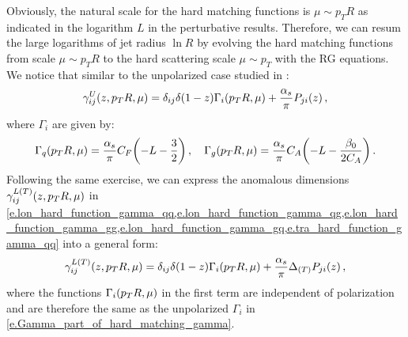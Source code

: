 \documentclass[a4paper, 11 pt]{article}
\begin{document}
Obviously, the natural scale for the hard matching functions is $\mu \sim p_T R$ as indicated in the logarithm $L$ in the perturbative results. Therefore, we can resum the large logarithms of jet radius $\ln R$ by evolving the hard matching functions from scale $\mu \sim p_T R$ to the hard scattering scale $\mu \sim p_T$ with the RG equations.
We notice that similar to the unpolarized case studied in \cite{Kang:2017glf}:
\begin{equation}
\gamma _{ij}^{U} \pqty{z, p_TR, \mu}
=
\delta _{ij} \delta (1-z) \Gamma _i \pqty{p_TR, \mu} + \frac{\alpha _s}{\pi} P_{ji}(z)
\, ,
\end{equation}
where $\Gamma _i$ are given by:
\begin{equation}
\label{e.Gamma_part_of_hard_matching_gamma}
\Gamma _q \pqty{p_TR, \mu}
=
\frac{\alpha _s}{\pi} C_F \pqty{- L - \frac{3}{2}}
\, ,
\quad
\Gamma _g \pqty{p_TR, \mu}
=
\frac{\alpha _s}{\pi} C_A \pqty{- L - \frac{\beta _0}{2 C_A}}
\, .
\end{equation}
Following the same exercise, we can express the anomalous dimensions $\gamma _{ij}^{L(T)} \pqty{z, p_TR, \mu}$ in \cref{e.lon_hard_function_gamma_qq,e.lon_hard_function_gamma_qg,e.lon_hard_function_gamma_gg,e.lon_hard_function_gamma_gq,e.tra_hard_function_gamma_qq} into a general form:
\begin{equation}
\gamma _{ij}^{L(T)} \pqty{z, p_TR, \mu}
=
\delta _{ij} \delta (1-z) \Gamma _i \pqty{p_TR, \mu} + \frac{\alpha _s}{\pi} \Delta_{(T)} P_{ji}(z)
\, ,
\end{equation}
where the functions $\Gamma _i \pqty{p_TR, \mu}$ in the first term are independent of polarization and are therefore the same as the unpolarized $\Gamma _i$ in \cref{e.Gamma_part_of_hard_matching_gamma}.
\end{document}
